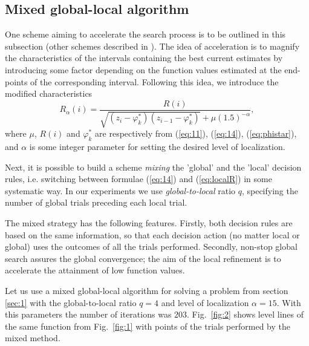 \documentclass{llncs}
\begin{document}
\subsection{Mixed global-local algorithm}\label{mixed}

One scheme aiming to accelerate the search process is to be outlined in this subsection (other schemes described in \cite{Kvasov2006,Kvasov2015} ). The idea of acceleration is to magnify the characteristics of the intervals containing the best current estimates by introducing some factor depending on the function values estimated at the end-points of the corresponding interval. Following this idea, we introduce the modified characteristics 
\begin{equation}\label{eq:localR}
  R_\alpha(i) = \frac{R(i)}{\sqrt{(z_i-\varphi_k^\ast)(z_{i-1}-\varphi_k^\ast)}+\mu (1.5)^{-\alpha}},
\end{equation}
where $\mu$, $R(i)$ and $\varphi_k^\ast$ are respectively from (\ref{eq:11}), (\ref{eq:14}), (\ref{eq:phistar}), and $\alpha$ is some integer parameter for setting the desired level of localization. 

Next, it is possible to build a scheme \textit{mixing} the 'global' and the 'local' decision rules, i.e. switching between formulae (\ref{eq:14}) and (\ref{eq:localR}) in some systematic way. In our experiments we use \textit{global-to-local} ratio $q$, specifying the number of global trials preceding each local trial.

The mixed strategy has the following features. 	Firstly, both decision rules are based on the same information, so that each decision action (no matter local or global) uses the outcomes of all the trials performed. Secondly, non-stop global search assures the global convergence; the aim of the local refinement is to accelerate the attainment of low function values. 

Let us use a mixed global-local algorithm for solving a problem from section \ref{sec:1} with the global-to-local ratio $q=4$ and level of localization $\alpha = 15$. With this parameters the number of iterations was $203$. Fig.~\ref{fig:2} shows level lines of the same function from Fig.~\ref{fig:1} with points of the trials performed by the mixed method.
\end{document}
